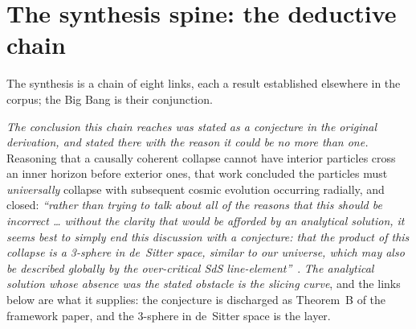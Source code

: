 \documentclass[11pt,a4paper]{article}
\theoremstyle{plain}
\theoremstyle{definition}
\theoremstyle{remark}
\begin{document}
\section{The synthesis spine: the deductive chain}\label{sec:synthesis}
The synthesis is a chain of eight links, each a result established elsewhere in the corpus;
the Big Bang is their conjunction.

\emph{The conclusion this chain reaches was stated as a conjecture in the original derivation, and
stated there with the reason it could be no more than one.} Reasoning that a causally coherent collapse
cannot have interior particles cross an inner horizon before exterior ones, that work concluded the
particles must \emph{universally} collapse with subsequent cosmic evolution occurring radially, and
closed: \emph{``rather than trying to talk about all of the reasons that this should be incorrect \dots
without the clarity that would be afforded by an analytical solution, it seems best to simply end this
discussion with a conjecture: that the product of this collapse is a 3-sphere in de~Sitter space,
similar to our universe, which may also be described globally by the \emph{over}-critical SdS
line-element''}~\cite[\S4.4]{JanzenThesis}. \emph{The analytical solution whose absence was the stated
obstacle is the slicing curve}, and the links below are what it supplies: the conjecture is discharged
as Theorem~B of the framework paper, and the 3-sphere in de~Sitter space is the layer.
\end{document}
